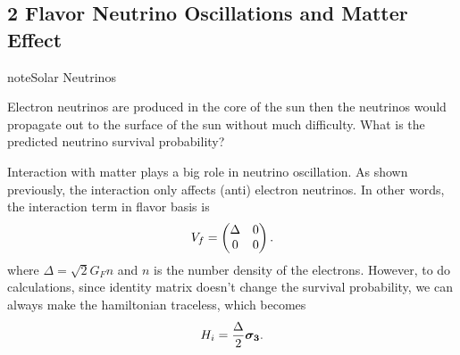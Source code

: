 \documentclass[letterpaper,12pt,english]{sphinxmanual}
\begin{document}

\subsection{2 Flavor Neutrino Oscillations and Matter Effect}
\label{msw:flavor-neutrino-oscillations-and-matter-effect}\label{msw:index-2}
\begin{notice}{note}{Solar Neutrinos}

Electron neutrinos are produced in the core of the sun then the neutrinos would propagate out to the surface of the sun without much difficulty. What is the predicted neutrino survival probability?
\end{notice}

Interaction with matter plays a big role in neutrino oscillation. As shown previously, the interaction only affects (anti) electron neutrinos. In other words, the interaction term in flavor basis is
\begin{gather}
\begin{split}V_f = \begin{pmatrix} \Delta & 0 \\ 0 & 0  \end{pmatrix}.\end{split}\notag
\end{gather}
where \(\Delta = \sqrt{2} G_F n\) and \(n\) is the number density of the electrons. However, to do calculations, since identity matrix doesn't change the survival probability, we can always make the hamiltonian traceless, which becomes
\begin{gather}
\begin{split}H_i=\frac{\Delta}{2} \boldsymbol{\sigma_3}.\end{split}\notag
\end{gather}
\end{document}
